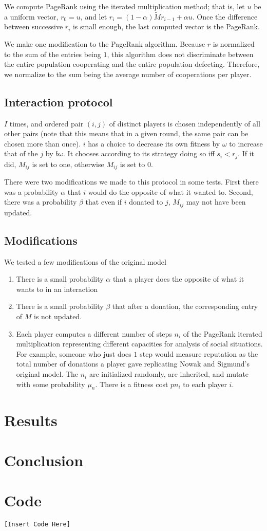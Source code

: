\documentclass{amsart}
\begin{document}
We compute PageRank using the iterated multiplication method; that is, let $u$ be a uniform vector, $r_0 = u$, and let $r_i = (1-\alpha)\tilde M r_{i-1} + \alpha u$. Once the difference between successive $r_i$ is small enough, the last computed vector is the PageRank.

We make one modification to the PageRank algorithm. Because $r$ is normalized to the sum of the entries being $1$, this algorithm does not discriminate between the entire population cooperating and the entire population defecting. Therefore, we normalize to the sum being the average number of cooperations per player.

\subsection{Interaction protocol}
$I$ times, and ordered pair $(i,j)$ of distinct players is chosen independently of all other pairs (note that this means that in a given round, the same pair can be chosen more than once). $i$ has a choice to decrease its own fitness by $\omega$ to increase that of the $j$ by $b \omega$. It chooses according to its strategy doing so iff $s_i < r_j$. If it did, $M_{ij}$ is set to one, otherwise $M_{ij}$ is set to $0$. 

There were two modifications we made to this protocol in some tests. First there was a probability $\alpha$ that $i$ would do the opposite of what it wanted to. Second, there was a probability $\beta$ that even if $i$ donated to $j$, $M_{ij}$ may not have been updated. 

\subsection{Modifications}
We tested a few modifications of the original model
\begin{enumerate}
\item
There is a small probability $\alpha$ that a player does the opposite of what it wants to in an interaction
\item
There is a small probability $\beta$ that after a donation, the corresponding entry of $M$ is not updated.
\item
Each player computes a different number of steps $n_i$ of the PageRank iterated multiplication representing different capacities for analysis of social situations. For example, someone who just does $1$ step would measure reputation as the total number of donations a player gave replicating Nowak and Sigmund's original model. The $n_i$ are initialized randomly, are inherited, and mutate with some probability $\mu_n$. There is a fitness cost $p n_i$ to each player $i$. 
\end{enumerate}

\section{Results}

\section{Conclusion}

\section{Code}
\begin{verbatim}
[Insert Code Here]
\end{verbatim}




\end{document}
